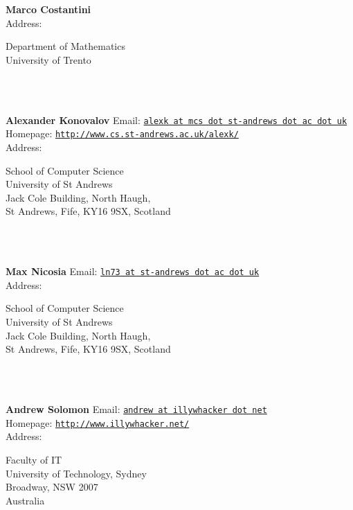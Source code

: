 \documentclass[a4paper,11pt]{report}
\begin{document}
\begin{titlepage}
\mbox{}\\
{\mbox{}\\
\small \noindent \textbf{Marco Costantini    }\\
  Address: \begin{minipage}[t]{8cm}\noindent
 Department of Mathematics\\
 University of Trento\\
 \end{minipage}
}\\
{\mbox{}\\
\small \noindent \textbf{Alexander Konovalov    }  Email: \href{mailto://alexk at mcs dot st-andrews dot ac dot uk} {\texttt{alexk at mcs dot st-andrews dot ac dot uk}}\\
  Homepage: \href{http://www.cs.st-andrews.ac.uk/~alexk/} {\texttt{http://www.cs.st-andrews.ac.uk/\texttt{}alexk/}}\\
  Address: \begin{minipage}[t]{8cm}\noindent
 School of Computer Science\\
 University of St Andrews\\
 Jack Cole Building, North Haugh,\\
 St Andrews, Fife, KY16 9SX, Scotland\\
 \end{minipage}
}\\
{\mbox{}\\
\small \noindent \textbf{Max Nicosia   }  Email: \href{mailto://ln73 at st-andrews dot ac dot uk} {\texttt{ln73 at st-andrews dot ac dot uk}}\\
  Address: \begin{minipage}[t]{8cm}\noindent
 School of Computer Science\\
 University of St Andrews\\
 Jack Cole Building, North Haugh,\\
 St Andrews, Fife, KY16 9SX, Scotland\\
 \end{minipage}
}\\
{\mbox{}\\
\small \noindent \textbf{Andrew Solomon    }  Email: \href{mailto://andrew at illywhacker dot net} {\texttt{andrew at illywhacker dot net}}\\
  Homepage: \href{http://www.illywhacker.net/} {\texttt{http://www.illywhacker.net/}}\\
  Address: \begin{minipage}[t]{8cm}\noindent
 Faculty of IT\\
 University of Technology, Sydney\\
 Broadway, NSW 2007\\
 Australia\\
 \end{minipage}
}\\
\end{titlepage}
\end{document}

